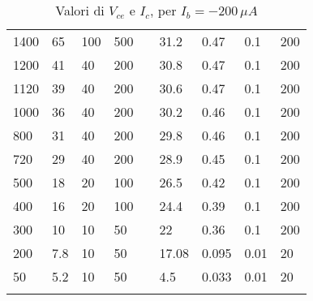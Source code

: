 \begin{longtable}[c]{|l|l|l|l|l|l|l|l|l|}
    1400          & 65                        & 100                       & 500                       &  & 31.2       & 0.47                      & 0.1                       & 200                       \\ \cline{1-4} \cline{6-9}
    1200          & 41                        & 40                        & 200                       &  & 30.8       & 0.47                      & 0.1                       & 200                       \\ \cline{1-4} \cline{6-9}
    1120          & 39                        & 40                        & 200                       &  & 30.6       & 0.47                      & 0.1                       & 200                       \\ \cline{1-4} \cline{6-9}
    1000          & 36                        & 40                        & 200                       &  & 30.2       & 0.46                      & 0.1                       & 200                       \\ \cline{1-4} \cline{6-9}
    800           & 31                        & 40                        & 200                       &  & 29.8       & 0.46                      & 0.1                       & 200                       \\ \cline{1-4} \cline{6-9}
    720           & 29                        & 40                        & 200                       &  & 28.9       & 0.45                      & 0.1                       & 200                       \\ \cline{1-4} \cline{6-9}
    500           & 18                        & 20                        & 100                       &  & 26.5       & 0.42                      & 0.1                       & 200                       \\ \cline{1-4} \cline{6-9}
    400           & 16                        & 20                        & 100                       &  & 24.4       & 0.39                      & 0.1                       & 200                       \\ \cline{1-4} \cline{6-9}
    300           & 10                        & 10                        & 50                        &  & 22         & 0.36                      & 0.1                       & 200                       \\ \cline{1-4} \cline{6-9}
    200           & 7.8                       & 10                        & 50                        &  & 17.08      & 0.095                     & 0.01                      & 20                        \\ \cline{1-4} \cline{6-9}
    50            & 5.2                       & 10                        & 50                        &  & 4.5        & 0.033                    & 0.01                      & 20                        \\ \cline{1-4} \cline{6-9}
    \caption{\label{tab:Tabella1}{Valori di $V_{ce}$ e $I_c$, per $I_b=-200\,\mu A$}}                                                                                                                        \\
\end{longtable}
